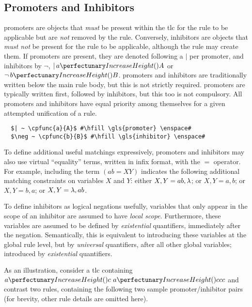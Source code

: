 \subsection{\label{sec:cps:prominhi}Promoters and Inhibitors}

\Glspl{promoter} are objects that \emph{must} be present within the \gls{tlc} for the rule to be applicable but are \emph{not} removed by the rule.  Conversely, \glspl{inhibitor} are objects that \emph{must not} be present for the rule to be applicable, although the rule may create them.  If \glspl{promoter} are present, they are denoted following a \(|\) per \gls{promoter}, and \glspl{inhibitor} by \(\neg\), \eg{} \(|\,\cpfunc{a}{A}\) or \(\neg\,\cpfunc{b}{B}\).  \Glspl{promoter} and \glspl{inhibitor} are traditionally written below the main rule body, but this is not strictly required.  \Glspl{promoter} are typically written first, followed by \glspl{inhibitor}, but this too is not compulsory.  All \glspl{promoter} and \glspl{inhibitor} have equal priority among themselves for a given attempted unification of a rule.

\lstset{xleftmargin=.5in, xrightmargin=.5in} 
\begin{lstlisting}
  $| ~ \cpfunc{a}{A}$ #\hfill \gls{promoter} \enspace#
  $\neg ~ \cpfunc{b}{B}$ #\hfill \gls{inhibitor} \enspace#
\end{lstlisting}

To define additional useful matchings expressively, 
\glspl{promoter} and \glspl{inhibitor} may also use virtual ``equality'' terms, 
written in infix format, with the \(=\) operator.
For example, including the term \((ab = XY)\) indicates the following additional matching constraints on variables \(X\) and \(Y\): either \(X, Y = ab, \lambda\); or \(X, Y = a, b\); or \(X, Y = b, a\); or \(X, Y = \lambda, ab\).

To define \glspl{inhibitor} as logical negations usefully,
variables that only appear in the scope of an \gls{inhibitor} are assumed to have \emph{local scope}. 
Furthermore, these variables are assumed to be defined by \emph{existential} quantifiers, immediately after the negation. 
Semantically, this is equivalent to introducing these variables at the global rule level, 
but by \emph{universal} quantifiers, after all other global variables;
introduced by \emph{existential} quantifiers.

As an illustration, consider a \gls{tlc} containing \(\cpfunc{a}{c} ~ \cpfunc{a}{ccc}\) and contrast two rules, 
containing the following two sample \gls{promoter}/\gls{inhibitor} pairs 
(for brevity, other rule details are omitted here).

